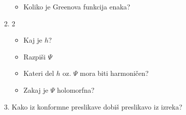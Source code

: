 \documentclass{article}
\begin{document}
\begin{enumerate}
\begin{itemize}
            \item Koliko je Greenova funkcija enaka?
        \end{itemize}
        \item 2
        \begin{itemize}
            \item Kaj je $h$?
            \item Razpiši $\Psi$
            \item Kateri del $h$ oz. $\Psi$ mora biti harmoničen?
            \item Zakaj je $\Psi$ holomorfna?    
        \end{itemize}
        \item Kako iz konformne preslikave dobiš preslikavo iz izreka?
    \end{enumerate}
\end{document}
